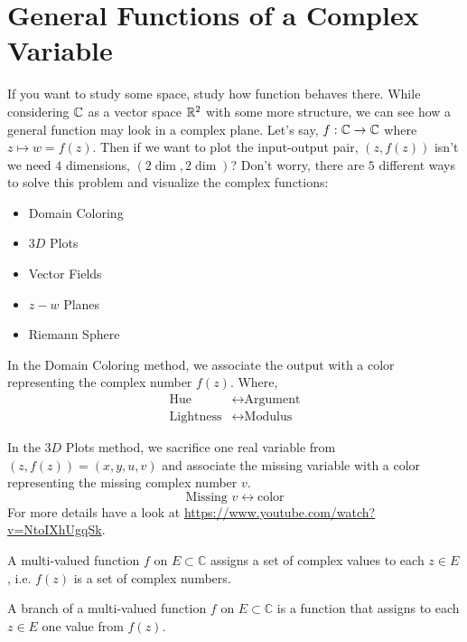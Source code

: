 \chapter{General Functions of a Complex Variable}
If you want to study some space, study how function behaves there. While considering $\Bbb{C}$ as a vector space $\Bbb{R}^2$ with some more structure, we can see how a general function may look in a complex plane. Let's say, $f:\Bbb{C}\rightarrow\Bbb{C}$ where $z\mapsto w=f(z)$. Then if we want to plot the input-output pair, $(z,f(z))$ isn't we need $4$ dimensions, $(2\dim,2\dim)$? Don't worry, there are $5$ different ways to solve this problem and visualize the complex functions:
\begin{itemize}
    \item Domain Coloring 
    \item $3D$ Plots
    \item Vector Fields
    \item $z-w$ Planes
    \item Riemann Sphere
\end{itemize}

In the Domain Coloring method, we associate the output with a color representing the complex number $f(z)$. Where, 
\begin{align*}
    \text{Hue}&\leftrightarrow\text{Argument}\\
    \text{Lightness}&\leftrightarrow\text{Modulus}
\end{align*}

In the $3D$ Plots method, we sacrifice one real variable from $(z,f(z))=(x,y,u,v)$ and associate the missing variable with a color representing the missing complex number $v$. 
$$\text{Missing }v\leftrightarrow\text{color}$$
For more details have a look at \url{https://www.youtube.com/watch?v=NtoIXhUgqSk}. 

\begin{defn}
A multi-valued function $f$ on $E\subset\mathbb C$ assigns a set of complex values to each $z\in E$, i.e. $f(z)$ is a set of complex numbers.
\end{defn}

\begin{defn}
    A branch of a multi-valued function $f$ on $E\subset\mathbb C$ is a function that assigns to each $z\in E$ one value from $f(z)$. 
\end{defn}

